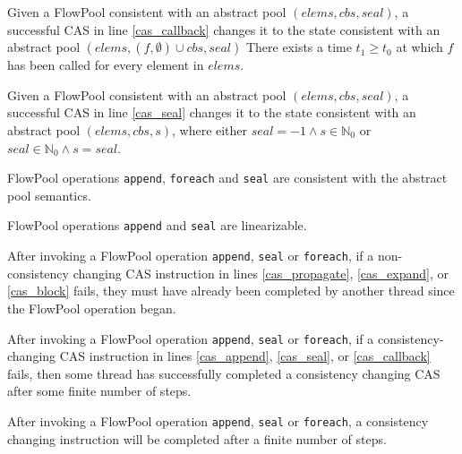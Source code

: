 \documentclass[runningheads,a4paper]{llncs}
\begin{document}
\begin{lemma}
Given a FlowPool consistent with an abstract pool $(elems, cbs, seal)$, 
a successful CAS in line \ref{cas_callback} changes it 
to the state consistent with an abstract pool $(elems, (f, \emptyset)
\cup cbs, seal)$
There exists a time $t_1 \geq t_0$ at which $f$ has been called for
every element in $elems$.
\end{lemma}

\begin{lemma}
Given a FlowPool consistent with an abstract pool $(elems, cbs, seal)$, 
a successful CAS in line \ref{cas_seal} changes it to the state 
consistent with an abstract pool $(elems, cbs, s)$, where either $seal
= -1 \wedge s \in \mathbb{N}_0$ or $seal \in \mathbb{N}_0 \wedge s = seal$.
\end{lemma}

\begin{theorem}[Safety]
FlowPool operations \verb=append=, \verb=foreach=
and \verb=seal= are consistent with the abstract pool semantics.
\end{theorem}

\begin{theorem}
FlowPool operations \verb=append= and \verb=seal= are linearizable.
\end{theorem}

\begin{lemma}
After invoking a FlowPool operation \verb=append=, \verb=seal= or
\verb=foreach=, if a non-consistency changing CAS instruction in lines
\ref{cas_propagate}, \ref{cas_expand}, or \ref{cas_block} fails, they must have
already been completed by another thread since the FlowPool operation began.
\end{lemma}

\begin{lemma}
After invoking a FlowPool operation \verb=append=, \verb=seal= or
\verb=foreach=, if a consistency-changing CAS instruction in lines
\ref{cas_append}, \ref{cas_seal}, or \ref{cas_callback} fails, then some thread
has successfully completed a consistency changing CAS after some finite number
of steps.
\end{lemma}

\begin{lemma}
After invoking a FlowPool operation \verb=append=, \verb=seal= or
\verb=foreach=, a consistency changing instruction will be completed after 
a finite number of steps.
\end{lemma}
\end{document}
